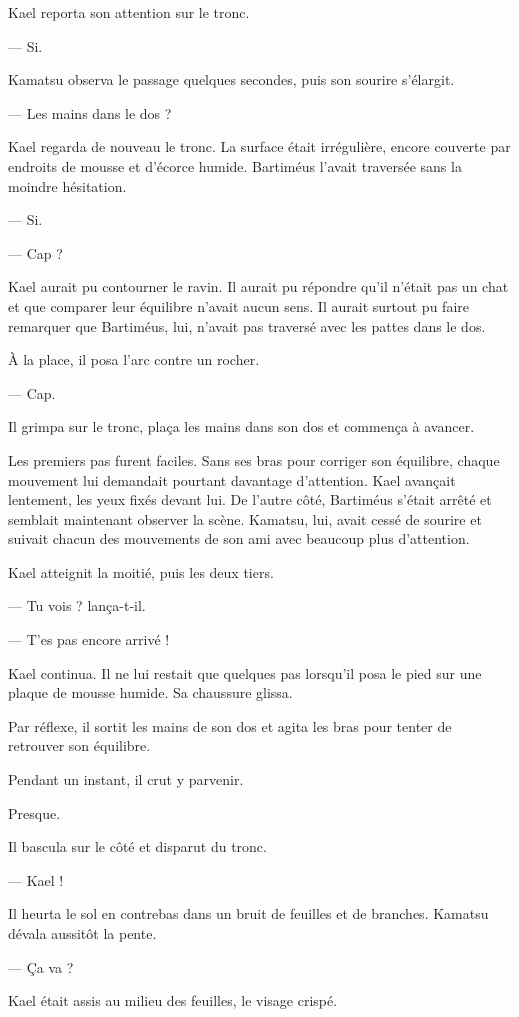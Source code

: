 Kael reporta son attention sur le tronc.

— Si.

Kamatsu observa le passage quelques secondes, puis son sourire s'élargit.

— Les mains dans le dos ?

Kael regarda de nouveau le tronc. La surface était irrégulière, encore couverte
par endroits de mousse et d'écorce humide. Bartiméus l'avait traversée sans la
moindre hésitation.

— Si.

— Cap ?

Kael aurait pu contourner le ravin. Il aurait pu répondre qu'il n'était pas un
chat et que comparer leur équilibre n'avait aucun sens. Il aurait surtout pu
faire remarquer que Bartiméus, lui, n'avait pas traversé avec les pattes dans
le dos.

À la place, il posa l'arc contre un rocher.

— Cap.

Il grimpa sur le tronc, plaça les mains dans son dos et commença à avancer.

Les premiers pas furent faciles. Sans ses bras pour corriger son équilibre,
chaque mouvement lui demandait pourtant davantage d'attention. Kael avançait
lentement, les yeux fixés devant lui. De l'autre côté, Bartiméus s'était arrêté
et semblait maintenant observer la scène. Kamatsu, lui, avait cessé de sourire
et suivait chacun des mouvements de son ami avec beaucoup plus d'attention.

Kael atteignit la moitié, puis les deux tiers.

— Tu vois ? lança-t-il.

— T'es pas encore arrivé !

Kael continua. Il ne lui restait que quelques pas lorsqu'il posa le pied sur
une plaque de mousse humide. Sa chaussure glissa.

Par réflexe, il sortit les mains de son dos et agita les bras pour tenter de
retrouver son équilibre.

Pendant un instant, il crut y parvenir.

Presque.

Il bascula sur le côté et disparut du tronc.

— Kael !

Il heurta le sol en contrebas dans un bruit de feuilles et de branches.
Kamatsu dévala aussitôt la pente.

— Ça va ?

Kael était assis au milieu des feuilles, le visage crispé.

